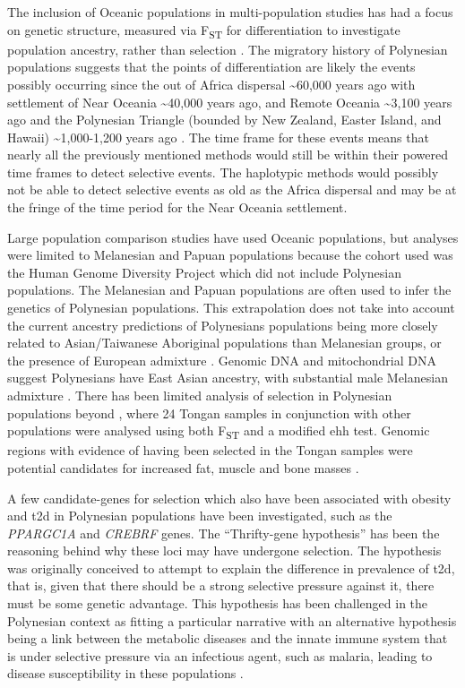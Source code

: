 \documentclass[]{report}
\begin{document}
The inclusion of Oceanic populations in multi-population studies has had
a focus on genetic structure, measured via F\textsubscript{ST} for
differentiation to investigate population ancestry, rather than
selection \citep{Friedlaender2008, Tennessen2011}. The migratory history
of Polynesian populations suggests that the points of differentiation
are likely the events possibly occurring since the out of Africa
dispersal \textasciitilde{}60,000 years ago \citep{Soares2012} with
settlement of Near Oceania \textasciitilde{}40,000 years ago, and Remote
Oceania \textasciitilde{}3,100 years ago \citep{Matisoo-Smith2004} and
the Polynesian Triangle (bounded by New Zealand, Easter Island, and
Hawaii) \textasciitilde{}1,000-1,200 years ago \citep{Wilmshurst2011}.
The time frame for these events means that nearly all the previously
mentioned methods would still be within their powered time frames to
detect selective events. The haplotypic methods would possibly not be
able to detect selective events as old as the Africa dispersal and may
be at the fringe of the time period for the Near Oceania settlement.

Large population comparison studies have used Oceanic populations, but
analyses were limited to Melanesian and Papuan populations because the
cohort used was the Human Genome Diversity Project \citep{Cann2002}
which did not include Polynesian populations. The Melanesian and Papuan
populations are often used to infer the genetics of Polynesian
populations. This extrapolation does not take into account the current
ancestry predictions of Polynesians populations being more closely
related to Asian/Taiwanese Aboriginal populations than Melanesian
groups, or the presence of European admixture \citep{Friedlaender2008}.
Genomic DNA and mitochondrial DNA suggest Polynesians have East Asian
ancestry, with substantial male Melanesian admixture
\citep{Kayser2008a}. There has been limited analysis of selection in
Polynesian populations beyond \citet{Kimura2008}, where 24 Tongan
samples in conjunction with other populations were analysed using both
F\textsubscript{ST} and a modified \gls{ehh} test. Genomic regions with
evidence of having been selected in the Tongan samples were potential
candidates for increased fat, muscle and bone masses \citep{Kimura2008}.

A few candidate-genes for selection which also have been associated with
obesity and \gls{t2d} in Polynesian populations have been investigated,
such as the \emph{PPARGC1A} \citep{Myles2011} and \emph{CREBRF}
\citep{Minster2016} genes. The ``Thrifty-gene hypothesis''
\citep{Neel1962} has been the reasoning behind why these loci may have
undergone selection. The hypothesis was originally conceived to attempt
to explain the difference in prevalence of \gls{t2d}, that is, given
that there should be a strong selective pressure against it, there must
be some genetic advantage. This hypothesis has been challenged in the
Polynesian context as fitting a particular narrative
\citep{Gosling2014, Gosling2015, Cadzow2016} with an alternative
hypothesis being a link between the metabolic diseases and the innate
immune system that is under selective pressure via an infectious agent,
such as malaria, leading to disease susceptibility in these populations
\citep{Gosling2015}.
\end{document}
